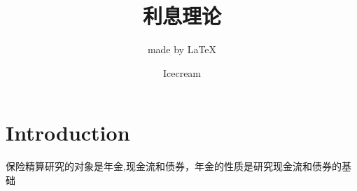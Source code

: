 \documentclass[cn,11pt,chinese,black,toc=twocol]{elegantbook}
\title{利息理论}
\subtitle{made by \LaTeX{} }
\author{Icecream}
\begin{document}
\def\angles#1{{%
		\vbox{\hrule height .2pt
			\kern 1pt
			\hbox{$\scriptstyle {#1}\kern 1pt$}%
		}\kern-.05pt \vrule width .2pt
}}
%
\maketitle
\tableofcontents

\chapter*{Introduction}
保险精算研究的对象是年金,现金流和债券，年金的性质是研究现金流和债券的基础







\end{document}
